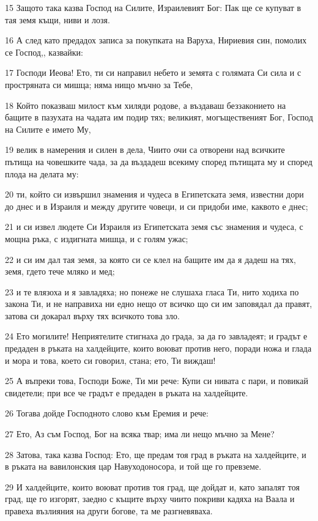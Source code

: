 \par 15 Защото така казва Господ на Силите, Израилевият Бог: Пак ще се купуват в тая земя къщи, ниви и лозя.
\par 16 А след като предадох записа за покупката на Варуха, Нириевия син, помолих се Господ,, казвайки:
\par 17 Господи Иеова! Ето, ти си направил небето и земята с голямата Си сила и с простряната си мишца; няма нищо мъчно за Тебе,
\par 18 Който показваш милост към хиляди родове, а въздаваш беззаконието на бащите в пазухата на чадата им подир тях; великият, могъщественият Бог, Господ на Силите е името Му,
\par 19 велик в намерения и силен в дела, Чиито очи са отворени над всичките пътища на човешките чада, за да въздадеш всекиму според пътищата му и според плода на делата му:
\par 20 ти, който си извършил знамения и чудеса в Египетската земя, известни дори до днес и в Израиля и между другите човеци, и си придоби име, каквото е днес;
\par 21 и си извел людете Си Израиля из Египетската земя със знамения и чудеса, с мощна ръка, с издигната мишца, и с голям ужас;
\par 22 и си им дал тая земя, за която си се клел на бащите им да я дадеш на тях, земя, гдето тече мляко и мед;
\par 23 и те влязоха и я завладяха; но понеже не слушаха гласа Ти, нито ходиха по закона Ти, и не направиха ни едно нещо от всичко що си им заповядал да правят, затова си докарал върху тях всичкото това зло.
\par 24 Ето могилите! Неприятелите стигнаха до града, за да го завладеят; и градът е предаден в ръката на халдейците, които воюват против него, поради ножа и глада и мора и това, което си говорил, стана; ето, Ти виждаш!
\par 25 А въпреки това, Господи Боже, Ти ми рече: Купи си нивата с пари, и повикай свидетели; при все че градът е предаден в ръката на халдейците.
\par 26 Тогава дойде Господното слово към Еремия и рече:
\par 27 Ето, Аз съм Господ, Бог на всяка твар; има ли нещо мъчно за Мене?
\par 28 Затова, така казва Господ: Ето, ще предам тоя град в ръката на халдейците, и в ръката на вавилонския цар Навуходоносора, и той ще го превземе.
\par 29 И халдейците, които воюват против тоя град, ще дойдат и, като запалят тоя град, ще го изгорят, заедно с къщите върху чиито покриви кадяха на Ваала и правеха възлияния на други богове, та ме разгневяваха.
